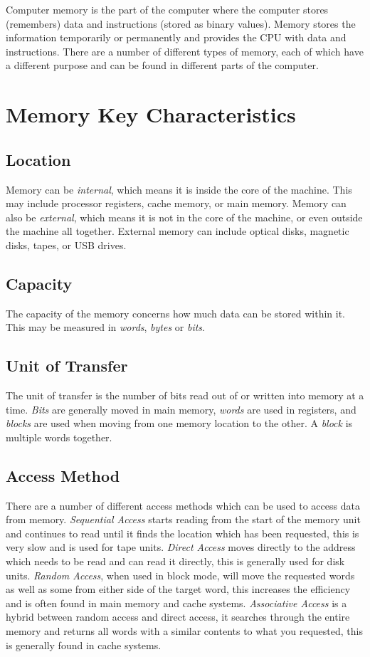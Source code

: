 
Computer memory is the part of the computer where the computer stores (remembers) data and instructions (stored as binary values). Memory stores the information temporarily or permanently and provides the CPU with data and instructions. There are a number of different types of memory, each of which have a different purpose and can be found in different parts of the computer.

\section*{Memory Key Characteristics}
\subsection*{Location}
Memory can be \textit{internal}, which means it is inside the core of the machine. This may include processor registers, cache memory, or main memory. Memory can also be \textit{external}, which means it is not in the core of the machine, or even outside the machine all together. External memory can include optical disks, magnetic disks, tapes, or USB drives.
\subsection*{Capacity}
The capacity of the memory concerns how much data can be stored within it. This may be measured in \textit{words}, \textit{bytes} or \textit{bits}.
\subsection*{Unit of Transfer}
The unit of transfer is the number of bits read out of or written into memory at a time. \textit{Bits} are generally moved in main memory, \textit{words} are used in registers, and \textit{blocks} are used when moving from one memory location to the other. A \textit{block} is multiple words together. 
\subsection*{Access Method}
There are a number of different access methods which can be used to access data from memory. \textit{Sequential Access} starts reading from the start of the memory unit and continues to read until it finds the location which has been requested, this is very slow and is used for tape units. \textit{Direct Access} moves directly to the address which needs to be read and can read it directly, this is generally used for disk units. \textit{Random Access}, when used in block mode, will move the requested words as well as some from either side of the target word, this increases the efficiency and is often found in main memory and cache systems. \textit{Associative Access} is a hybrid between random access and direct access, it searches through the entire memory and returns all words with a similar contents to what you requested, this is generally found in cache systems. 
